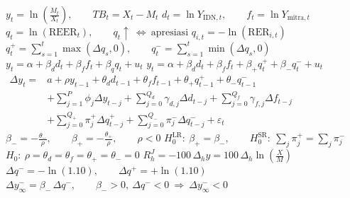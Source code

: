 \documentclass{article}
\begin{document}
\fontsize{22}{30}\selectfont
\vspace*{0.15in}\noindent\(\displaystyle y_t=\ln\!\left(\frac{M_t}{X_t}\right),\qquad TB_t=X_t-M_t\)
\newpage
\vspace*{0.15in}\noindent\(\displaystyle d_t=\ln Y_{\mathrm{IDN},t},\qquad f_t=\ln Y_{\mathrm{mitra},t}\)
\newpage
\vspace*{0.15in}\noindent\(\displaystyle q_t=\ln(\mathrm{REER}_t),\qquad q_t\uparrow\ \Longleftrightarrow\ \mathrm{apresiasi}\)
\newpage
\vspace*{0.15in}\noindent\(\displaystyle q_{i,t}=-\ln(\mathrm{RER}_{i,t})\)
\newpage
\vspace*{0.15in}\noindent\(\displaystyle q_t^+=\sum_{s=1}^{t}\max(\Delta q_s,0),\qquad q_t^-=\sum_{s=1}^{t}\min(\Delta q_s,0)\)
\newpage
\vspace*{0.15in}\noindent\(\displaystyle y_t=\alpha+\beta_d d_t+\beta_f f_t+\beta_q q_t+u_t\)
\newpage
\vspace*{0.15in}\noindent\(\displaystyle y_t=\alpha+\beta_d d_t+\beta_f f_t+\beta_+q_t^++\beta_-q_t^-+u_t\)
\newpage
\vspace*{0.15in}\noindent\(\displaystyle \begin{aligned}\Delta y_t={}&a+\rho y_{t-1}+\theta_d d_{t-1}+\theta_f f_{t-1}+\theta_+q_{t-1}^{+}+\theta_-q_{t-1}^{-}\\ &+\sum_{j=1}^{P}\phi_j\Delta y_{t-j}+\sum_{j=0}^{Q_d}\gamma_{d,j}\Delta d_{t-j}+\sum_{j=0}^{Q_f}\gamma_{f,j}\Delta f_{t-j}\\ &+\sum_{j=0}^{Q_+}\pi_j^+\Delta q_{t-j}^++\sum_{j=0}^{Q_-}\pi_j^-\Delta q_{t-j}^-+\varepsilon_t\end{aligned}\)
\newpage
\vspace*{0.15in}\noindent\(\displaystyle \beta_-=-\frac{\theta_-}{\rho},\qquad \beta_+=-\frac{\theta_+}{\rho},\qquad \rho<0\)
\newpage
\vspace*{0.15in}\noindent\(\displaystyle H_0^{\mathrm{LR}}:\ \beta_+=\beta_-,\qquad H_0^{\mathrm{SR}}:\ \sum_j\pi_j^+=\sum_j\pi_j^-\)
\newpage
\vspace*{0.15in}\noindent\(\displaystyle H_0:\ \rho=\theta_d=\theta_f=\theta_+=\theta_-=0\)
\newpage
\vspace*{0.15in}\noindent\(\displaystyle R_h^{J}=-100\,\Delta_h y=100\,\Delta_h\ln\!\left(\frac{X}{M}\right)\)
\newpage
\vspace*{0.15in}\noindent\(\displaystyle \Delta q^-=-\ln(1.10),\qquad \Delta q^+=+\ln(1.10)\)
\newpage
\vspace*{0.15in}\noindent\(\displaystyle \Delta y_{\infty}^{-}=\beta_-\,\Delta q^-,\qquad \beta_->0,\ \Delta q^-<0\ \Longrightarrow\ \Delta y_\infty^-<0\)
\end{document}
